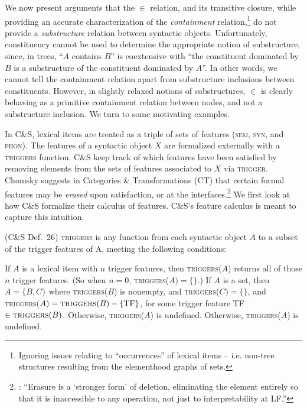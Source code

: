\documentclass[output=paper]{langsci/langscibook}
\begin{document}
We now present arguments that the $\in$ relation, and its transitive closure,
while providing an accurate characterization of the \emph{containment}
relation,\footnote{Ignoring issues relating to \enquote{occurrences} of lexical
items -- i.e. non-tree structures resulting from the elementhood graphs of
sets.} do not pro\-vide a \emph{substructure} relation between syntactic
objects.  Unfortunately, constituency cannot be used to determine the
appropriate notion of substructure, since, in trees, \enquote{$A$ contains $B$}
is coextensive with ``the constituent dominated by $B$ is a substructure of the
constituent dominated by $A$''. In other words, we cannot tell the containment
relation apart from substructure inclusions between constituents. However, in
slightly relaxed notions of substructures, $\in$ is clearly behaving as a
primitive containment relation between nodes, and not a substructure inclusion.
We turn to some motivating examples.

In C\&S\nocite{ColSta2016}, lexical items are treated as a triple of sets of
features (\textsc{sem}, \textsc{syn}, and \textsc{phon}).  The features of a
syntactic object $X$ are formalized externally with a \textsc{triggers}
function. C\&S\nocite{ColSta2016} keep track of which features have been
satisfied by removing elements from the sets of features associated to $X$ via
\textsc{trigger}. Chomsky suggests in Categories \& Transformations (CT) that
certain formal features may be \emph{erased} upon satisfaction, or at the
interfaces.\footnote{\cite[280]{Chomsky1995}: \enquote{Erasure is a `stronger
form' of deletion, eliminating the element entirely so that it is inaccessible
to any operation, not just to interpretability at \gls{LF}.}} We first look at how
C\&S\nocite{ColSta2016} formalize their calculus of features.
C\&S\nocite{ColSta2016}'s feature calculus is meant to capture this intuition.

\ea\label{ex:key:33.24}(C\&S\nocite{ColSta2016} Def.\ 26) \textsc{triggers} is any
function from each syntactic object $A$ to a subset of the trigger features of
A, meeting the following conditions:
    \begin{xlisti}
        \ex   If $A$ is a lexical item with $n$ trigger features, then
        \textsc{triggers}($A$) returns all of those $n$ trigger features. (So when
        $n=0$, \textsc{triggers}($A)=\{\}$.)
        \ex If $A$ is a set, then $A=\{B,C\}$ where \textsc{triggers}($B$)
        is nonempty, and \textsc{triggers}($C)=\{\}$, and
        \textsc{triggers}($A)=\textsc{triggers}(B)-\{\text{TF}\}$, for some trigger
        feature TF $\in \textsc{triggers}(B)$.  Otherwise, \textsc{triggers}($A$)
        is undefined.
        \ex Otherwise, \textsc{triggers}($A$) is undefined.
    \end{xlisti}
\z
\end{document}

